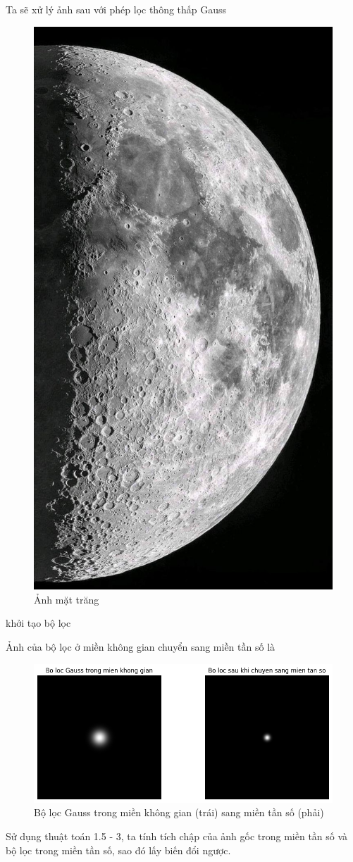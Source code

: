 \documentclass[12pt,a4paper]{report}
\numberwithin{equation}{section}
\theoremstyle{definition} %
\begin{document}
Ta sẽ xử lý ảnh sau với phép lọc thông thấp Gauss
\begin{figure}[H]
\centering
\includegraphics[width=0.4
\linewidth]{img/moon.jpg}
\caption{Ảnh mặt trăng}
\label{fig116}
\end{figure}
khởi tạo bộ lọc



Ảnh của bộ lọc ở miền không gian chuyển sang miền tần số là 
\begin{figure}[H]
\centering
\includegraphics[width=0.8\linewidth]{img/LPG-spacedomainTo-frequency.png}
\caption{Bộ lọc Gauss trong miền không gian (trái) sang miền tần số (phải)}
\label{fig117}
\end{figure}
Sử dụng thuật toán 1.5 - 3, ta tính tích chập của ảnh gốc trong miền tần số và bộ lọc trong miền tần số, sao đó lấy biến đổi ngược.
\end{document}
